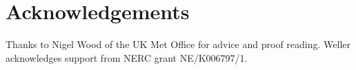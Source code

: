 \section*{Acknowledgements}
Thanks to Nigel Wood of the UK Met Office for advice and proof reading. Weller acknowledges support from NERC grant NE/K006797/1.



